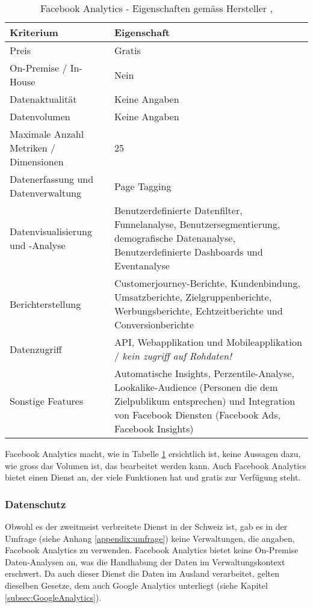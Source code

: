\begin{table}[h]
	\centering
	\begin{tabular}{ | p{4cm} | p{10cm} |}
		\hline
		\textbf{Kriterium} & \textbf{Eigenschaft}  \\ 
		\hline
    Preis & Gratis \\
    \hline
    On-Premise / In-House & Nein \\
    \hline
    Datenaktualität & Keine Angaben \\
    \hline
		Datenvolumen & Keine Angaben \\
    \hline
    Maximale Anzahl Metriken / Dimensionen & 25 \\
    \hline
		Datenerfassung und Datenverwaltung &  Page Tagging \\
    \hline
    Datenvisualisierung und -Analyse & Benutzerdefinierte Datenfilter, Funnelanalyse, Benutzersegmentierung,  demografische Datenanalyse, Benutzerdefinierte Dashboards und Eventanalyse \\
    \hline
    Berichterstellung & Customerjourney-Berichte, Kundenbindung, Umsatzberichte, Zielgruppenberichte, Werbungsberichte, Echtzeitberichte und Conversionberichte \\
    \hline
    Datenzugriff & API, Webapplikation und Mobileapplikation / \textit{kein zugriff auf Rohdaten!}\\
    \hline
    Sonstige Features & Automatische Insights, Perzentile-Analyse, Lookalike-Audience (Personen die dem Zielpublikum entsprechen) und Integration von Facebook Diensten (Facebook Ads, Facebook Insights) \\
		\hline  
	\end{tabular}
	\caption{Facebook Analytics - Eigenschaften gemäss Hersteller \parencite{facebookAnalyticsFeatures}, \parencite{facebookAnalyticsHelp}}
	\label{tab: facebookAnalyticsFeatures}
\end{table}

Facebook Analytics macht, wie in Tabelle \ref{tab: facebookAnalyticsFeatures} ersichtlich ist, keine Aussagen dazu, wie gross das Volumen ist, das bearbeitet werden kann. 
Auch Facebook Analytics bietet einen Dienst an, der viele Funktionen hat und gratis zur Verfügung steht. 

\newpage

\subsubsection{Datenschutz}
Obwohl es der zweitmeist verbreitete Dienst in der Schweiz ist, gab es in der Umfrage (siehe Anhang \ref{appendix:umfrage}) keine Verwaltungen, die angaben, Facebook Analytics zu verwenden. Facebook Analytics bietet keine On-Premise Daten-Analysen an, was die Handhabung der Daten im Verwaltungskontext erschwert. Da auch dieser Dienst die Daten im Ausland verarbeitet, gelten dieselben Gesetze, dem auch Google Analytics unterliegt (siehe Kapitel \ref{subsec:GoogleAnalytics}). 

